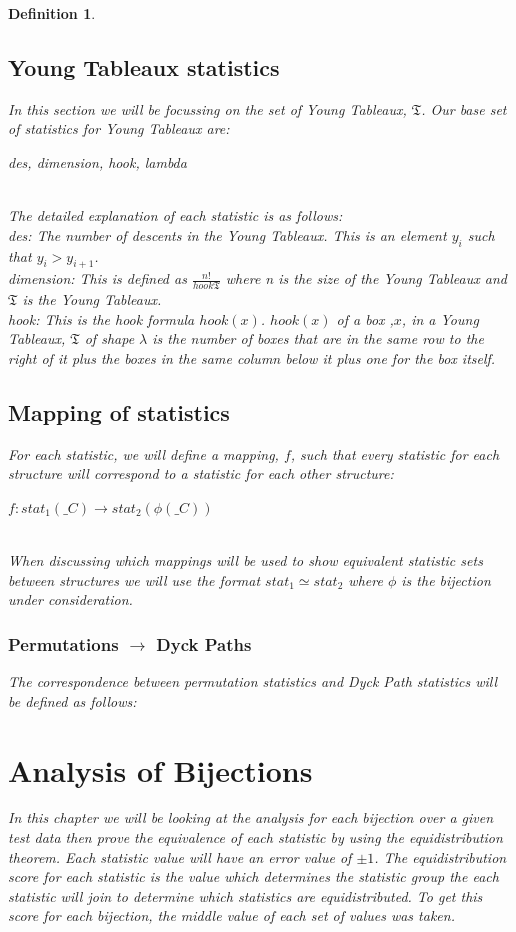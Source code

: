 \documentclass[12pt]{article}
\newtheorem{definition}{Definition}
\newcommand{\YoungTab}{\mathfrak{T}}
\begin{document}
\begin{definition}
\subsection{Young Tableaux statistics}
In this section we will be focussing on the set of Young Tableaux, $\YoungTab$. Our base set of statistics for Young Tableaux are:\\
\centerline{des, dimension, hook, lambda}\\
The detailed explanation of each statistic is as follows:\\
des: The number of descents in the Young Tableaux. This is an element $y_i$ such that $y_i > y_{i+1}$.\\
dimension: This is defined as $\frac{n!}{hook \YoungTab}$ where n is the size of the Young Tableaux and $\YoungTab$ is the Young Tableaux. \\
hook: This is the hook formula $hook(x)$. $hook(x)$ of a box ,$x$, in a Young Tableaux, $\YoungTab$ of shape $\lambda$ is the number of boxes that are in the same row to the right of it plus the boxes in the same column below it plus one for the box itself.\\

\subsection{Mapping of statistics}
For each statistic, we will define a mapping, $f$, such that every statistic for each structure will correspond to a statistic for each other structure:\\
\centerline{$f: stat_1({\mathfrak_{C}}) \rightarrow stat_2(\phi(\mathfrak_{C}))$}\\
When discussing which mappings will be used to show equivalent statistic sets between structures we will use the format $stat_1 \simeq stat_2$ where $\phi$ is the bijection under consideration.

\subsubsection{Permutations $\rightarrow$ Dyck Paths}
The correspondence between permutation statistics and Dyck Path statistics will be defined as follows:


\section{Analysis of Bijections}
In this chapter we will be looking at the analysis for each bijection over a given test data then prove the equivalence of each statistic by using the equidistribution theorem. Each statistic value will have an error value of $\pm 1$. The equidistribution score for each statistic is the value which determines the statistic group the each statistic will join to determine which statistics are equidistributed. To get this score for each bijection, the middle value of each set of values was taken.


\end{definition}
\end{document}
